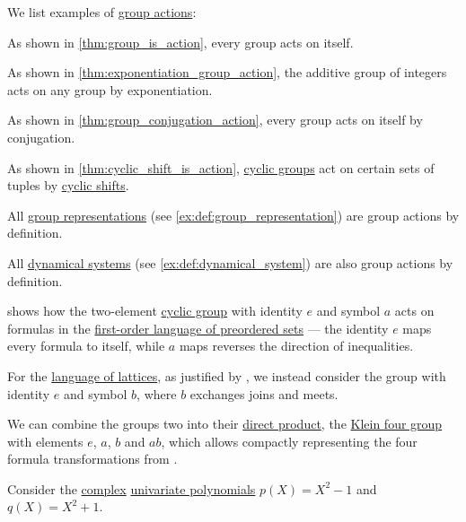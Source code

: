 \begin{example}\label{ex:def:group_action}
  We list examples of \hyperref[def:group_action]{group actions}:
  \begin{thmenum}
     As shown in \cref{thm:group_is_action}, every group acts on itself.

     As shown in \cref{thm:exponentiation_group_action}, the additive group of integers acts on any group by exponentiation.

     As shown in \cref{thm:group_conjugation_action}, every group acts on itself by conjugation.

     As shown in \cref{thm:cyclic_shift_is_action}, \hyperref[def:cyclic_group]{cyclic groups} act on certain sets of tuples by \hyperref[def:cyclic_shift]{cyclic shifts}.

     All \hyperref[def:group_representation]{group representations} (see \cref{ex:def:group_representation}) are group actions by definition.

     All \hyperref[def:dynamical_system]{dynamical systems} (see \cref{ex:def:dynamical_system}) are also group actions by definition.

      shows how the two-element \hyperref[def:cyclic_group]{cyclic group} with identity \( e \) and symbol \( a \) acts on formulas in the \hyperref[def:preordered_set/theory]{first-order language of preordered sets} --- the identity \( e \) maps every formula to itself, while \( a \) maps reverses the direction of inequalities.

    For the \hyperref[def:lattice/theory]{language of lattices}, as justified by , we instead consider the group with identity \( e \) and symbol \( b \), where \( b \) exchanges joins and meets.

    We can combine the groups two into their \hyperref[def:first_order_direct_product]{direct product}, the \hyperref[def:klein_four_group]{Klein four group} with elements \( e \), \( a \), \( b \) and \( ab \), which allows compactly representing the four formula transformations from .

     Consider the \hyperref[def:complex_numbers]{complex} \hyperref[def:univariate_polynomial]{univariate polynomials} \( p(X) = X^2 - 1 \) and \( q(X) = X^2 + 1 \).


\end{thmenum}
\end{example}
